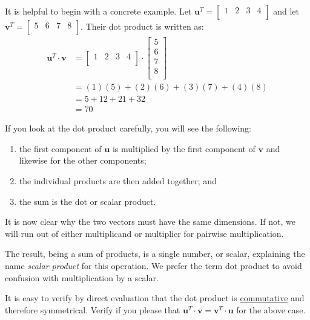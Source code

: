 \documentclass[
  a4paper,
]{article}
\begin{document}
It is helpful to begin with a concrete example. Let
\(\mathbf{u}^{T} = \begin{bmatrix}1&2&3&4\\\end{bmatrix}\) and let
\(\mathbf{v}^{T} = \begin{bmatrix}5&6&7&8\\\end{bmatrix}\). Their dot
product is written as: \[
\begin{aligned}
\mathbf{u}^{T}\cdot\mathbf{v} &= \begin{bmatrix}1&2&3&4\\\end{bmatrix} \cdot \begin{bmatrix} 5\\6\\7\\8\\ \end{bmatrix}\\
&= (1)(5) + (2)(6) + (3)(7) + (4)(8)\\
&= 5 + 12 + 21 + 32\\
&= 70
\end{aligned}
\]

If you look at the dot product carefully, you will see the following:

\begin{enumerate}
\item
  the first component of \(\mathbf{u}\) is multiplied by the first
  component of \(\mathbf{v}\) and likewise for the other components;
\item
  the individual products are then added together; and
\item
  the sum is the dot or scalar product.
\end{enumerate}

It is now clear why the two vectors must have the same dimensions. If
not, we will run out of either multiplicand or multiplier for pairwise
multiplication.

The result, being a sum of products, is a single number, or scalar,
explaining the name \emph{scalar product} for this operation. We prefer
the term dot product to avoid confusion with multiplication by a scalar.

It is easy to verify by direct evaluation that the dot product is
\href{http://mathworld.wolfram.com/Commutative.html}{commutative} and
therefore symmetrical. Verify if you please that
\(\mathbf{u}^{T}\cdot\mathbf{v} = \mathbf{v}^{T}\cdot\mathbf{u}\) for
the above case.
\end{document}
